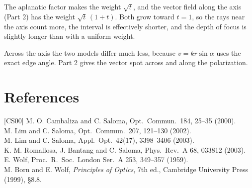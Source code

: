 \documentclass[11pt]{article}
\begin{document}
 The aplanatic factor makes the weight $\sqrt t$, and the vector field along the axis (Part 2) has the weight
$\sqrt t\,(1 + t)$. Both grow toward $t = 1$, so the rays near the axis count more, the interval is effectively
shorter, and the depth of focus is slightly longer than with a uniform weight.


 Across the axis the two models differ much less, because $v = kr\sin\alpha$ uses the exact edge angle. Part 2
gives the vector spot across and along the polarization.

\section*{References}
\small
[CS00] M. O. Cambaliza and C. Saloma, Opt.\ Commun.\ 184, 25--35 (2000).\\
\relax[LS02] M. Lim and C. Saloma, Opt.\ Commun.\ 207, 121--130 (2002).\\
\relax[LS03] M. Lim and C. Saloma, Appl.\ Opt.\ 42(17), 3398--3406 (2003).\\
\relax[Rom03] K. M. Romallosa, J. Bantang and C. Saloma, Phys.\ Rev.\ A 68, 033812 (2003).\\
E. Wolf, Proc.\ R.\ Soc.\ London Ser.\ A 253, 349--357 (1959).\\
M. Born and E. Wolf, \emph{Principles of Optics}, 7th ed., Cambridge University Press (1999), §8.8.
\end{document}
